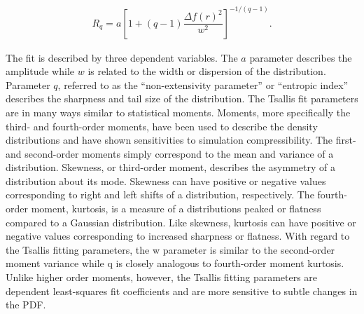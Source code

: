 \documentclass[a4paper,10pt]{article}
\begin{document}
\begin{align*}
    R_q = a \left[ 1+(q-1) \dfrac{\Delta f(r)^2}{w^2} \right]^{-1/(q-1)}.
\end{align*}

{\noindent}The fit is described by three dependent variables. The $a$ parameter describes the amplitude while $w$ is related to the width or dispersion of the distribution. Parameter $q$, referred to as the ``non-extensivity parameter'' or ``entropic index'' describes the sharpness and tail size of the distribution. The Tsallis fit parameters are in many ways similar to statistical moments. Moments, more specifically the third- and fourth-order moments, have been used to describe the density distributions and have shown sensitivities to simulation compressibility. The first- and second-order moments simply correspond to the mean and variance of a distribution. Skewness, or third-order moment, describes the asymmetry of a distribution about its mode. Skewness can have positive or negative values corresponding to right and left shifts of a distribution, respectively. The fourth-order moment, kurtosis, is a measure of a distributions peaked or flatness compared to a Gaussian distribution. Like skewness, kurtosis can have positive or negative values corresponding to increased sharpness or flatness. With regard to the Tsallis fitting parameters, the w parameter is similar to the second-order moment variance while q is closely analogous to fourth-order moment kurtosis. Unlike higher order moments, however, the Tsallis fitting parameters are dependent least-squares fit coefficients and are more sensitive to subtle changes in the PDF.
\end{document}
